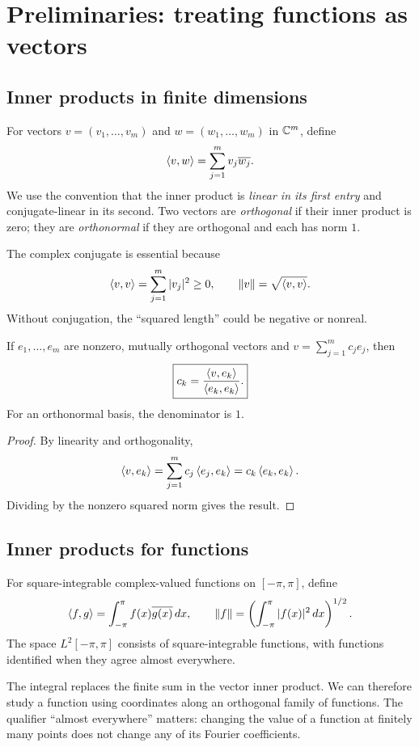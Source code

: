 \section{Preliminaries: treating functions as vectors}
\subsection{Inner products in finite dimensions}
\begin{definition}
For vectors $v=(v_1,\dots,v_m)$ and $w=(w_1,\dots,w_m)$ in $\mathbb{C}^m$, define
\begin{equation}\label{eq:vector-ip}
 \left\langle v,w\right\rangle=\sum_{j=1}^m v_j\overline{w_j}.
\end{equation}
We use the convention that the inner product is \emph{linear in its first entry}
and conjugate-linear in its second. Two vectors are \emph{orthogonal} if their
inner product is zero; they are \emph{orthonormal} if they are orthogonal
and each has norm $1$.
\end{definition}
The complex conjugate is essential because
\[
 \left\langle v,v\right\rangle=\sum_{j=1}^m |v_j|^2\geq0,
 \qquad \left\lVert v\right\rVert=\sqrt{\left\langle v,v\right\rangle}.
\]
Without conjugation, the ``squared length'' could be negative or nonreal.

\begin{proposition}\label{prop:projection}
If $e_1,\ldots,e_m$ are nonzero, mutually orthogonal vectors and
$v=\sum_{j=1}^m c_je_j$, then
\begin{equation}\label{eq:projection}
 \boxed{c_k=\frac{\left\langle v,e_k\right\rangle}{\left\langle e_k,e_k\right\rangle}.}
\end{equation}
For an orthonormal basis, the denominator is $1$.
\end{proposition}
\begin{proof}
By linearity and orthogonality,
\[
 \left\langle v,e_k\right\rangle=\sum_{j=1}^m c_j\left\langle e_j,e_k\right\rangle
 =c_k\left\langle e_k,e_k\right\rangle.
\]
Dividing by the nonzero squared norm gives the result.
\end{proof}

\subsection{Inner products for functions}
\begin{definition}\label{def:L2}
For square-integrable complex-valued functions on $[-\pi,\pi]$, define
\begin{equation}\label{eq:function-ip}
 \left\langle f,g\right\rangle=\int_{-\pi}^{\pi}f(x)\overline{g(x)}\,dx,
 \qquad
 \left\lVert f\right\rVert=\left(\int_{-\pi}^{\pi}|f(x)|^2\,dx\right)^{1/2}.
\end{equation}
The space $L^2[-\pi,\pi]$ consists of square-integrable functions, with functions
identified when they agree almost everywhere.
\end{definition}
The integral replaces the finite sum in the vector inner product. We can
therefore study a function using coordinates along an orthogonal family of functions.
The qualifier ``almost everywhere'' matters: changing the value of a function
at finitely many points does not change any of its Fourier coefficients.

